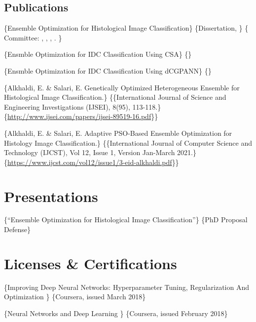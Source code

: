 \documentclass[letterpaper,10pt]{article}
\begin{document}
\section{Publications}


      \{Ensemble Optimization for Histological Image Classification\}
      \{Dissertation, \ut\}
      \{
  Committee: \ezz, \secondmember, \thirdmember, \fourthmember.
      \}

\{Ensmble Optimization for IDC Classification Using CSA\}
\{\}

\{Ensmble Optimization for IDC Classification Using dCGPANN\}
\{\}

      \{Alkhaldi, E. \& Salari, E. Genetically Optimized Heterogeneous Ensemble for Histological Image Classification.\}
      \{\small\{International Journal of Science and Engineering Investigations
    (IJSEI), 8(95), 113-118.\}
  \href{http://www.ijsei.com/papers/ijsei-89519-16.pdf}{\pdf} \{\url{http://www.ijsei.com/papers/ijsei-89519-16.pdf}\}\}

      \{Alkhaldi, E. \& Salari, E. Adaptive PSO-Based Ensemble Optimization for Histology Image Classification.\}
      \{\small\{International Journal of Computer Science and Technology
    (IJCST), Vol 12, Issue 1, Version Jan-March 2021.\}
  \href{https://www.ijcst.com/vol12/issue1/3-eid-alkhaldi.pdf}{\pdf} \{\url{https://www.ijcst.com/vol12/issue1/3-eid-alkhaldi.pdf}\}\}

\chapter{Presentations}
\label{sec:orga56cb35}

	\{``Ensemble Optimization for Histological Image Classification''\}
	\{PhD Proposal Defense\}

\chapter{Licenses \& Certifications}
\label{sec:orgf82167a}
\{Improving Deep Neural Networks: Hyperparameter Tuning, Regularization And Optimization
  \href{https://www.coursera.org/account/accomplishments/verify/SYMNEXXAAUM8}{\www}\}
\{Coursera, issued March 2018\}

\{Neural Networks and Deep Learning
  \href{https://www.coursera.org/account/accomplishments/verify/QVDGURZQCDDZ}{\www}\}
\{Coursera, issued February 2018\}
\end{document}

